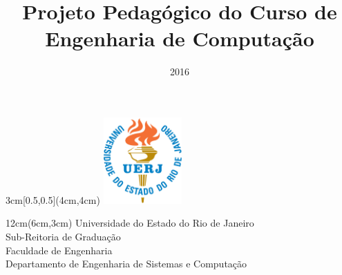 \documentclass[envcountsame,envcountchap,openany]{svmono}
\begin{document}
\begin{textblock*}{3cm}[0.5,0.5](4cm,4cm)
    \includegraphics[width=3cm]{imagens/logo_uerj_cor.jpg}
\end{textblock*}
\begin{textblock*}{12cm}(6cm,3cm)   %
    Universidade do Estado do Rio de Janeiro\\
    Sub-Reitoria de Graduação \\
    Faculdade de Engenharia\\
    Departamento de Engenharia de Sistemas e Computação
\end{textblock*}



\title{Projeto Pedagógico do Curso de Engenharia de Computação}
\subtitle{2016}
\date{}
\maketitle


\begin{minipage}{\textwidth}
\vfill
\tableofcontents
\end{minipage}
\frontmatter%
%
% 



\mainmatter%
%

%
\backmatter%

\appendix
\appendixpage

\addappheadtotoc



\end{document}
